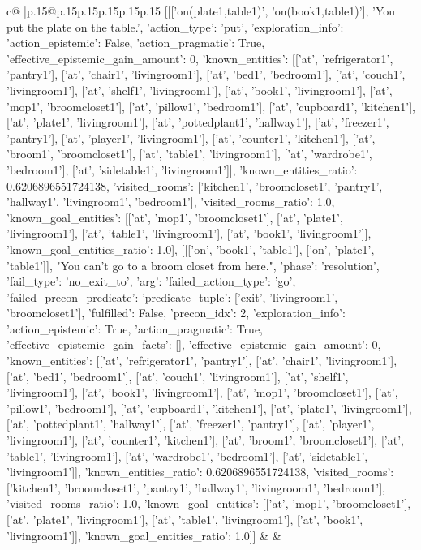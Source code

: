 \documentclass{article}
\begin{document}
{\begin{supertabular}{c@{$\;$}|p{.15\linewidth}@{}p{.15\linewidth}p{.15\linewidth}p{.15\linewidth}p{.15\linewidth}p{.15\linewidth}}
{{{	 [[['on(plate1,table1)', 'on(book1,table1)'], 'You put the plate on the table.', {'action_type': 'put', 'exploration_info': {'action_epistemic': False, 'action_pragmatic': True, 'effective_epistemic_gain_amount': 0, 'known_entities': [['at', 'refrigerator1', 'pantry1'], ['at', 'chair1', 'livingroom1'], ['at', 'bed1', 'bedroom1'], ['at', 'couch1', 'livingroom1'], ['at', 'shelf1', 'livingroom1'], ['at', 'book1', 'livingroom1'], ['at', 'mop1', 'broomcloset1'], ['at', 'pillow1', 'bedroom1'], ['at', 'cupboard1', 'kitchen1'], ['at', 'plate1', 'livingroom1'], ['at', 'pottedplant1', 'hallway1'], ['at', 'freezer1', 'pantry1'], ['at', 'player1', 'livingroom1'], ['at', 'counter1', 'kitchen1'], ['at', 'broom1', 'broomcloset1'], ['at', 'table1', 'livingroom1'], ['at', 'wardrobe1', 'bedroom1'], ['at', 'sidetable1', 'livingroom1']], 'known_entities_ratio': 0.6206896551724138, 'visited_rooms': ['kitchen1', 'broomcloset1', 'pantry1', 'hallway1', 'livingroom1', 'bedroom1'], 'visited_rooms_ratio': 1.0, 'known_goal_entities': [['at', 'mop1', 'broomcloset1'], ['at', 'plate1', 'livingroom1'], ['at', 'table1', 'livingroom1'], ['at', 'book1', 'livingroom1']], 'known_goal_entities_ratio': 1.0}}], [[['on', 'book1', 'table1'], ['on', 'plate1', 'table1']], "You can't go to a broom closet from here.", {'phase': 'resolution', 'fail_type': 'no_exit_to', 'arg': {'failed_action_type': 'go', 'failed_precon_predicate': {'predicate_tuple': ['exit', 'livingroom1', 'broomcloset1'], 'fulfilled': False, 'precon_idx': 2}}, 'exploration_info': {'action_epistemic': True, 'action_pragmatic': True, 'effective_epistemic_gain_facts': [], 'effective_epistemic_gain_amount': 0, 'known_entities': [['at', 'refrigerator1', 'pantry1'], ['at', 'chair1', 'livingroom1'], ['at', 'bed1', 'bedroom1'], ['at', 'couch1', 'livingroom1'], ['at', 'shelf1', 'livingroom1'], ['at', 'book1', 'livingroom1'], ['at', 'mop1', 'broomcloset1'], ['at', 'pillow1', 'bedroom1'], ['at', 'cupboard1', 'kitchen1'], ['at', 'plate1', 'livingroom1'], ['at', 'pottedplant1', 'hallway1'], ['at', 'freezer1', 'pantry1'], ['at', 'player1', 'livingroom1'], ['at', 'counter1', 'kitchen1'], ['at', 'broom1', 'broomcloset1'], ['at', 'table1', 'livingroom1'], ['at', 'wardrobe1', 'bedroom1'], ['at', 'sidetable1', 'livingroom1']], 'known_entities_ratio': 0.6206896551724138, 'visited_rooms': ['kitchen1', 'broomcloset1', 'pantry1', 'hallway1', 'livingroom1', 'bedroom1'], 'visited_rooms_ratio': 1.0, 'known_goal_entities': [['at', 'mop1', 'broomcloset1'], ['at', 'plate1', 'livingroom1'], ['at', 'table1', 'livingroom1'], ['at', 'book1', 'livingroom1']], 'known_goal_entities_ratio': 1.0}}]] 
	  } 
	   } 
	   } 
	 & & \\ 
 


\end{supertabular}}
\end{document}
